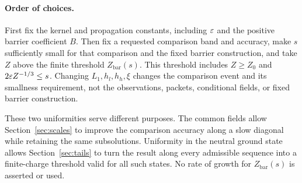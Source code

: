 \paragraph{Order of choices.}
First fix the kernel and propagation constants, including $\varepsilon$ and
the positive barrier coefficient $B$.  Then fix a requested comparison
band and accuracy, make $s$ sufficiently small for that comparison and
the fixed barrier construction, and take $Z$ above the finite threshold
$Z_{\mathrm{bar}}(s)$.  This threshold includes $Z\ge Z_0$ and
$2\varepsilon Z^{-1/3}\le s$.  Changing $L_1,h_l,h_h,\xi$ changes the comparison
event and its smallness requirement, not the observations, packets,
conditional fields, or fixed barrier construction.

These two uniformities serve different purposes.  The common fields
allow Section~\ref{sec:scales} to improve the comparison accuracy along
a slow diagonal while retaining the same subsolutions.  Uniformity in
the neutral ground state allows Section~\ref{sec:tails} to turn the
result along every admissible sequence into a finite-charge threshold
valid for all such states.  No rate of growth for
$Z_{\mathrm{bar}}(s)$ is asserted or used.
